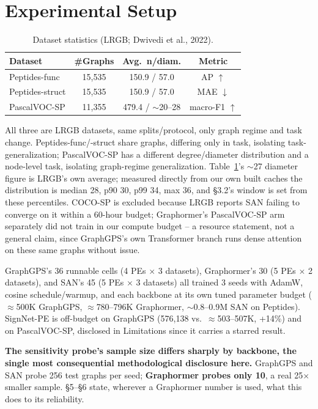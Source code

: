 \documentclass[10pt]{article}
\begin{document}
\section{Experimental Setup}
\begin{table}[h]
\centering\small
\begin{tabular}{lccc}
\toprule
\textbf{Dataset} & \textbf{\#Graphs} & \textbf{Avg.\ n/diam.} & \textbf{Metric} \\
\midrule
Peptides-func & 15,535 & 150.9 / 57.0 & AP $\uparrow$ \\
Peptides-struct & 15,535 & 150.9 / 57.0 & MAE $\downarrow$ \\
PascalVOC-SP & 11,355 & 479.4 / $\sim$20--28 & macro-F1 $\uparrow$ \\
\bottomrule
\end{tabular}
\caption{Dataset statistics (LRGB; Dwivedi et al., 2022).}
\label{tab:data}
\end{table}
All three are LRGB datasets, same splits/protocol, only graph regime and task change. Peptides-func/-struct share graphs, differing only in task, isolating task-generalization; PascalVOC-SP has a different degree/diameter distribution and a node-level task, isolating graph-regime generalization. Table~\ref{tab:data}'s $\sim$27 diameter figure is LRGB's own average; measured directly from our own built caches the distribution is median 28, p90 30, p99 34, max 36, and \S3.2's window is set from these percentiles. COCO-SP is excluded because LRGB reports SAN failing to converge on it within a 60-hour budget; Graphormer's PascalVOC-SP arm separately did not train in our compute budget -- a resource statement, not a general claim, since GraphGPS's own Transformer branch runs dense attention on these same graphs without issue.

GraphGPS's 36 runnable cells (4 PEs $\times$ 3 datasets), Graphormer's 30 (5 PEs $\times$ 2 datasets), and SAN's 45 (5 PEs $\times$ 3 datasets) all trained 3 seeds with AdamW, cosine schedule/warmup, and each backbone at its own tuned parameter budget ($\approx$500K GraphGPS, $\approx$780--796K Graphormer, $\sim$0.8--0.9M SAN on Peptides). SignNet-PE is off-budget on GraphGPS (576,138 vs.\ $\approx$503--507K, +14\%) and on PascalVOC-SP, disclosed in Limitations since it carries a starred result.

\textbf{The sensitivity probe's sample size differs sharply by backbone, the single most consequential methodological disclosure here.} GraphGPS and SAN probe 256 test graphs per seed; \textbf{Graphormer probes only 10}, a real 25$\times$ smaller sample. \S5--\S6 state, wherever a Graphormer number is used, what this does to its reliability.
\end{document}
